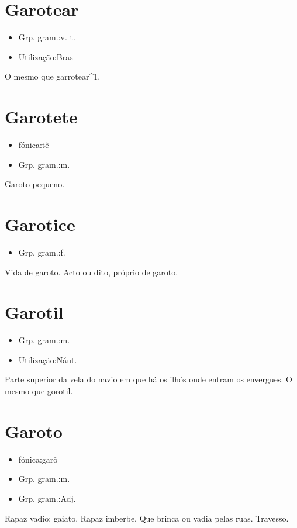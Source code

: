 \section{Garotear}
\begin{itemize}
\item {Grp. gram.:v. t.}
\end{itemize}
\begin{itemize}
\item {Utilização:Bras}
\end{itemize}
O mesmo que \textunderscore garrotear\textunderscore ^1.
\section{Garotete}
\begin{itemize}
\item {fónica:tê}
\end{itemize}
\begin{itemize}
\item {Grp. gram.:m.}
\end{itemize}
Garoto pequeno.
\section{Garotice}
\begin{itemize}
\item {Grp. gram.:f.}
\end{itemize}
Vida de garoto.
Acto ou dito, próprio de garoto.
\section{Garotil}
\begin{itemize}
\item {Grp. gram.:m.}
\end{itemize}
\begin{itemize}
\item {Utilização:Náut.}
\end{itemize}
Parte superior da vela do navio em que há os ilhós onde entram os envergues.
O mesmo que \textunderscore gorotil\textunderscore .
\section{Garoto}
\begin{itemize}
\item {fónica:garô}
\end{itemize}
\begin{itemize}
\item {Grp. gram.:m.}
\end{itemize}
\begin{itemize}
\item {Grp. gram.:Adj.}
\end{itemize}
Rapaz vadio; gaiato.
Rapaz imberbe.
Que brinca ou vadia pelas ruas.
Travesso.
